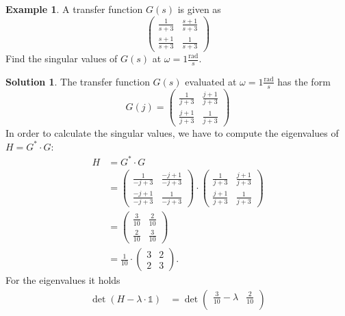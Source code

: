 \documentclass[a4paper,12 pt]{article}
\numberwithin{equation}{section}
\theoremstyle{definition}
\newtheorem{bsp}{Example}
\theoremstyle{remark}
\theoremstyle{definition}
\newtheorem*{lsg}{Solution}
\theoremstyle{definition}
\theoremstyle{definition}
\theoremstyle{remark}
\begin{document}
\newpage
\begin{bsp}
A transfer function $G(s)$ is given as
\begin{equation*}
\begin{pmatrix}
\frac{1}{s+3}&\frac{s+1}{s+3}\\[6pt]
\frac{s+1}{s+3}&\frac{1}{s+3}
\end{pmatrix}
\end{equation*}
Find the singular values of $G(s)$ at $\omega=1 \frac{\text{rad}}{s}$.
\newpage

\begin{lsg}
The transfer function $G(s)$ evaluated at $\omega=1\frac{\text{rad}}{{s}}$ has the form
\begin{equation*}
G(j)=\begin{pmatrix}
\frac{1}{j+3}&\frac{j+1}{j+3}\\[6pt]
\frac{j+1}{j+3}&\frac{1}{j+3}
\end{pmatrix}
\end{equation*}
In order to calculate the singular values, we have to compute the eigenvalues of $H=G^*\cdot G$:
\begin{equation*}
\begin{split}
H&=G^*\cdot G\\
&=\begin{pmatrix}
\frac{1}{-j+3}&\frac{-j+1}{-j+3}\\[6pt]
\frac{-j+1}{-j+3}&\frac{1}{-j+3}
\end{pmatrix}\cdot \begin{pmatrix}
\frac{1}{j+3}&\frac{j+1}{j+3}\\[6pt]
\frac{j+1}{j+3}&\frac{1}{j+3}
\end{pmatrix}\\
&=\begin{pmatrix}
\frac{3}{10}&\frac{2}{10}\\[6pt]
\frac{2}{10}&\frac{3}{10}
\end{pmatrix}\\
&=\frac{1}{10}\cdot \begin{pmatrix}
3&2\\
2&3
\end{pmatrix}.
\end{split}
\end{equation*}
For the eigenvalues it holds
\begin{equation*}
\begin{split}
\det(H-\lambda \cdot \mathbb{1})&=\det \begin{pmatrix}
\frac{3}{10}-\lambda&\frac{2}{10}\\[6pt]

\end{pmatrix}
\end{split}
\end{equation*}
\end{lsg}
\end{bsp}
\end{document}
